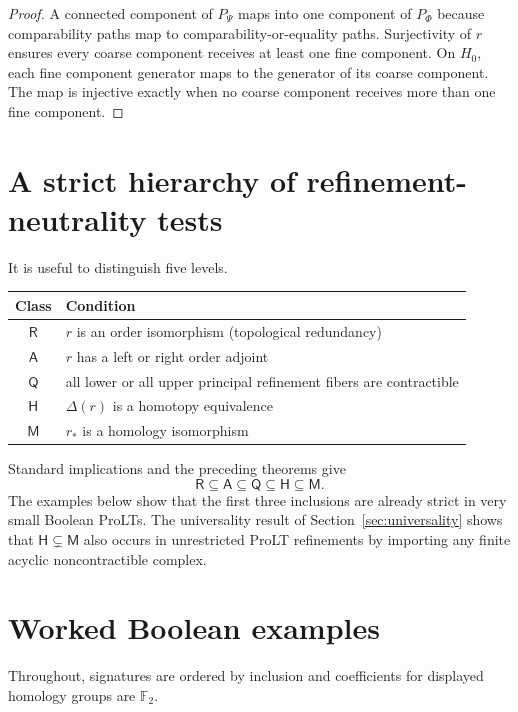 \documentclass[11pt]{article}
\theoremstyle{definition}
\newcommand{\F}{\mathbb F_2}
\begin{document}
\begin{proof}
A connected component of \(P_\Psi\) maps into one component of \(P_\Phi\) because comparability paths map to comparability-or-equality paths. Surjectivity of \(r\) ensures every coarse component receives at least one fine component. On \(H_0\), each fine component generator maps to the generator of its coarse component. The map is injective exactly when no coarse component receives more than one fine component.
\end{proof}

\section{A strict hierarchy of refinement-neutrality tests}\label{sec:hierarchy}

It is useful to distinguish five levels.

\begin{center}
\begin{tabular}{cl}
\toprule
Class & Condition \\
\midrule
\(\mathsf R\) & \(r\) is an order isomorphism (topological redundancy) \\
\(\mathsf A\) & \(r\) has a left or right order adjoint \\
\(\mathsf Q\) & all lower or all upper principal refinement fibers are contractible \\
\(\mathsf H\) & \(\Delta(r)\) is a homotopy equivalence \\
\(\mathsf M\) & \(r_*\) is a homology isomorphism \\
\bottomrule
\end{tabular}
\end{center}

Standard implications and the preceding theorems give
\[
\boxed{
\mathsf R\subseteq\mathsf A\subseteq\mathsf Q\subseteq\mathsf H\subseteq\mathsf M.
}
\]
The examples below show that the first three inclusions are already strict in very small Boolean ProLTs. The universality result of Section~\ref{sec:universality} shows that \(\mathsf H\subsetneq\mathsf M\) also occurs in unrestricted ProLT refinements by importing any finite acyclic noncontractible complex.

\section{Worked Boolean examples}\label{sec:examples}

Throughout, signatures are ordered by inclusion and coefficients for displayed homology groups are \(\F\).
\end{document}
